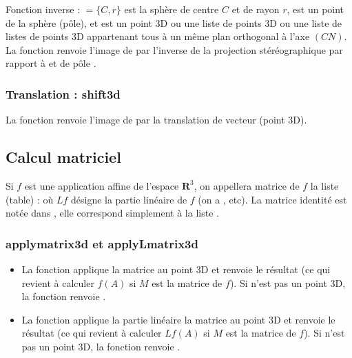 Fonction inverse  : $=\{C,r\}$ est la sphère de centre $C$ et de rayon $r$,  est un point de la sphère  (pôle), et  est un point 3D ou une liste de points 3D ou une liste de listes de points 3D appartenant tous à un même plan orthogonal à l'axe $(CN)$. La fonction renvoie l'image de  par l'inverse de la projection stéréographique par rapport à  et de pôle .


\subsubsection{Translation : shift3d}

La fonction  renvoie l'image de  par la translation de vecteur  (point 3D).

\subsection{Calcul matriciel}

Si $f$ est une application affine de l'espace $\mathbf R^3$, on appellera matrice de $f$ la liste (table) :
où $Lf$ désigne la partie linéaire de $f$ (on a , etc). La matrice identité est notée  dans \luadrawenv, elle correspond simplement à la liste .

\subsubsection{applymatrix3d et applyLmatrix3d}

\begin{itemize}
    \item La fonction  applique la matrice  au point 3D  et renvoie le résultat (ce qui revient à calculer $f(A)$ si $M$ est la matrice de $f$). Si  n'est pas un point 3D, la fonction renvoie .
    
    \item La fonction  applique la partie linéaire la matrice  au point 3D  et renvoie le résultat (ce qui revient à calculer $Lf(A)$ si $M$ est la matrice de $f$). Si  n'est pas un point 3D, la fonction renvoie .
\end{itemize}

